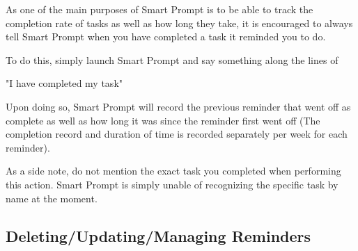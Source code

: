 \documentclass[11pt, oneside]{article}
\begin{document}
As one of the main purposes of Smart Prompt is to be able to track the completion rate of tasks as well as how long they take, it is encouraged to always tell Smart Prompt when you have completed a task it reminded you to do.

To do this, simply launch Smart Prompt and say something along the lines of
\begin{center}
"I have completed my task"
\end{center}
Upon doing so, Smart Prompt will record the previous reminder that went off as complete as well as how long it was since the reminder first went off (The completion record and duration of time is recorded separately per week for each reminder).

As a side note, do not mention the exact task you completed when performing this action. Smart Prompt is simply unable of recognizing the specific task by name at the moment.

\subsection{Deleting/Updating/Managing Reminders}
\end{document}
